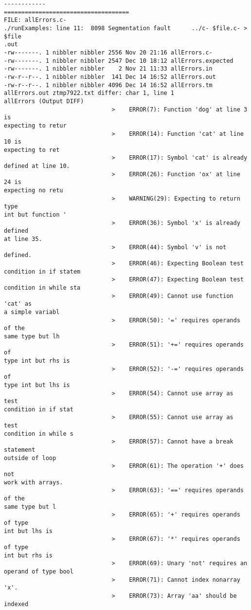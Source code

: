 \documentclass[12pt]{book}
\begin{document}
\begin{lstlisting}
------------
====================================
FILE: allErrors.c-
./runExamples: line 11:  8098 Segmentation fault      ../c- $file.c- > $file
.out
-rw-------. 1 nibbler nibbler 2556 Nov 20 21:16 allErrors.c-
-rw-------. 1 nibbler nibbler 2547 Dec 10 18:12 allErrors.expected
-rw-------. 1 nibbler nibbler    2 Nov 21 11:33 allErrors.in
-rw-r--r--. 1 nibbler nibbler  141 Dec 14 16:52 allErrors.out
-rw-r--r--. 1 nibbler nibbler 4096 Dec 14 16:52 allErrors.tm
allErrors.out ztmp7922.txt differ: char 1, line 1
allErrors (Output DIFF)
                               >    ERROR(7): Function 'dog' at line 3 is 
expecting to retur
                               >    ERROR(14): Function 'cat' at line 10 is 
expecting to ret
                               >    ERROR(17): Symbol 'cat' is already 
defined at line 10.
                               >    ERROR(26): Function 'ox' at line 24 is 
expecting no retu
                               >    WARNING(29): Expecting to return type 
int but function '
                               >    ERROR(36): Symbol 'x' is already defined
at line 35.
                               >    ERROR(44): Symbol 'v' is not defined.
                               >    ERROR(46): Expecting Boolean test 
condition in if statem
                               >    ERROR(47): Expecting Boolean test 
condition in while sta
                               >    ERROR(49): Cannot use function 'cat' as 
a simple variabl
                               >    ERROR(50): '=' requires operands of the 
same type but lh
                               >    ERROR(51): '+=' requires operands of 
type int but rhs is
                               >    ERROR(52): '-=' requires operands of 
type int but lhs is
                               >    ERROR(54): Cannot use array as test 
condition in if stat
                               >    ERROR(55): Cannot use array as test 
condition in while s
                               >    ERROR(57): Cannot have a break statement
outside of loop
                               >    ERROR(61): The operation '+' does not 
work with arrays.
                               >    ERROR(63): '==' requires operands of the
same type but l
                               >    ERROR(65): '+' requires operands of type
int but lhs is 
                               >    ERROR(67): '*' requires operands of type
int but rhs is 
                               >    ERROR(69): Unary 'not' requires an 
operand of type bool 
                               >    ERROR(71): Cannot index nonarray 'x'.
                               >    ERROR(73): Array 'aa' should be indexed 

\end{lstlisting}
\end{document}
